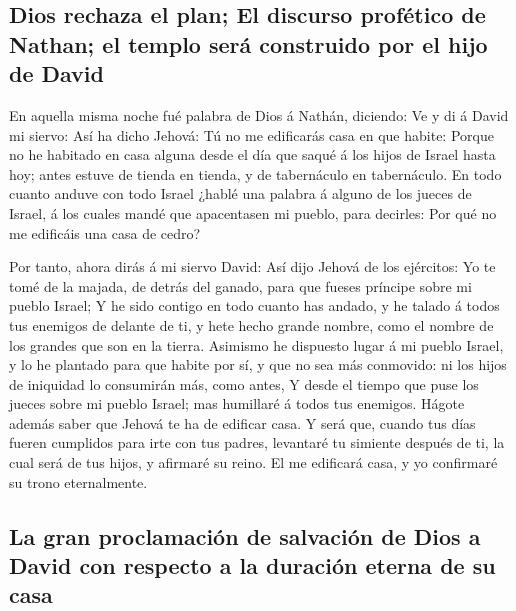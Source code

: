 \hypertarget{dios-rechaza-el-plan-el-discurso-profuxe9tico-de-nathan-el-templo-seruxe1-construido-por-el-hijo-de-david}{%
\subsection{Dios rechaza el plan; El discurso profético de Nathan; el
templo será construido por el hijo de
David}\label{dios-rechaza-el-plan-el-discurso-profuxe9tico-de-nathan-el-templo-seruxe1-construido-por-el-hijo-de-david}}

 En aquella misma noche fué palabra de Dios á Nathán,
diciendo:  Ve y di á David mi siervo: Así ha dicho Jehová:
Tú no me edificarás casa en que habite:  Porque no he
habitado en casa alguna desde el día que saqué á los hijos de Israel
hasta hoy; antes estuve de tienda en tienda, y de tabernáculo en
tabernáculo.  En todo cuanto anduve con todo Israel ¿hablé
una palabra á alguno de los jueces de Israel, á los cuales mandé que
apacentasen mi pueblo, para decirles: Por qué no me edificáis una casa
de cedro?

 Por tanto, ahora dirás á mi siervo David: Así dijo Jehová
de los ejércitos: Yo te tomé de la majada, de detrás del ganado, para
que fueses príncipe sobre mi pueblo Israel;  Y he sido
contigo en todo cuanto has andado, y he talado á todos tus enemigos de
delante de ti, y hete hecho grande nombre, como el nombre de los grandes
que son en la tierra.  Asimismo he dispuesto lugar á mi
pueblo Israel, y lo he plantado para que habite por sí, y que no sea más
conmovido: ni los hijos de iniquidad lo consumirán más, como antes,
 Y desde el tiempo que puse los jueces sobre mi pueblo
Israel; mas humillaré á todos tus enemigos. Hágote además saber que
Jehová te ha de edificar casa.  Y será que, cuando tus
días fueren cumplidos para irte con tus padres, levantaré tu simiente
después de ti, la cual será de tus hijos, y afirmaré su reino.
 El me edificará casa, y yo confirmaré su trono
eternalmente.

\hypertarget{la-gran-proclamaciuxf3n-de-salvaciuxf3n-de-dios-a-david-con-respecto-a-la-duraciuxf3n-eterna-de-su-casa}{%
\subsection{La gran proclamación de salvación de Dios a David con
respecto a la duración eterna de su
casa}\label{la-gran-proclamaciuxf3n-de-salvaciuxf3n-de-dios-a-david-con-respecto-a-la-duraciuxf3n-eterna-de-su-casa}}

